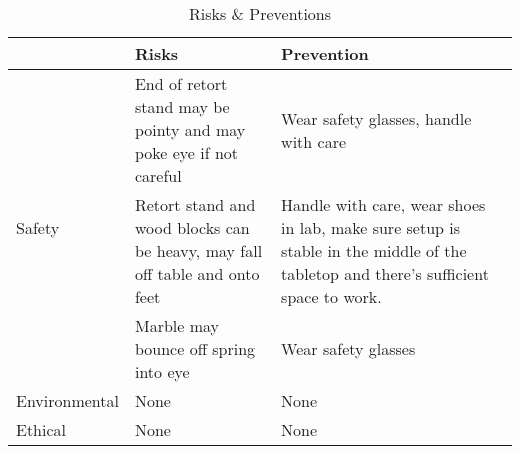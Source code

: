 \begin{table}[!htb]
    \begin{center}
        \begin{tabular}{|l|p{5cm}|p{5cm}|} 
            \hline
            ~ & Risks & Prevention \\ 
            \hline
            \multirow{3}{4em}{Safety} & End of retort stand may be pointy and may poke eye if not careful & Wear safety glasses, handle with care \\ 
            \cline{2-3}
            & Retort stand and wood blocks can be heavy, may fall off table and onto feet & Handle with care, wear shoes in lab, make sure setup is stable in the middle of the tabletop and there's sufficient space to work.\\
            \cline{2-3}
            & Marble may bounce off spring into eye & Wear safety glasses \\
            \hline
            Environmental & None & None \\
            \hline
            Ethical & None & None  \\ 
            \hline
        \end{tabular}
        \caption{Risks \& Preventions}
    \end{center}
\end{table}